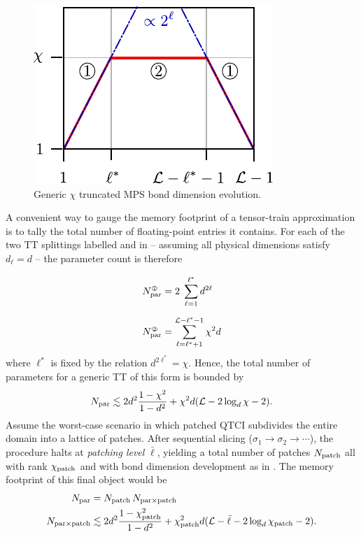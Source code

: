\begin{figure}[ht!]
	\centering
	\includegraphics{figures/TypicalBondDims.pdf}
	\caption{Generic $\chi$ truncated MPS bond dimension evolution.}
	\label{fig:typicalBondDim}
\end{figure}

A convenient way to gauge the memory footprint of a tensor-train approximation is to tally the total number of floating-point entries it contains. For each of the two TT splittings labelled  and  in  -- assuming all physical dimensions satisfy $d_\ell = d$ -- the parameter count is therefore

\begin{equation}
	\begin{aligned}
		N^{\raisebox{.5pt}{\tiny \textcircled{\raisebox{-0.6pt} {1}}}}_{\text{par}} &= 2\;\sum\limits_{\ell = 1}^{\ell^*} d^{2\ell}  \\[6pt]
		N^{\raisebox{.5pt}{\tiny \textcircled{\raisebox{-0.6pt} {2}}}}_{\text{par}} &= \sum\limits_{\ell = \ell^* + 1}^{\mL - \ell^* - 1} \chi^2d
	\end{aligned}
\end{equation}
where $\ell^*$ is fixed by the relation $d^{2\ell^*} = \chi$. Hence, the total number of parameters for a generic TT of this form is bounded by
\begin{equation} 
	N_{\text{par}} \lesssim 2 d^2 \frac{1 - \chi^2 }{1 - d^2} + \chi^2d (\mathcal{L} - 2 \log_d \chi - 2). 
\end{equation}
Assume the worst-case scenario in which patched QTCI subdivides the entire domain into a lattice of patches. After sequential slicing ($\sigma_1 \to \sigma_2 \to \cdots$), the procedure halts at \textit{patching level} ${\bar \ell}$, yielding a total number of patches $N_{\text{patch}}$ all with rank $\chi_{\text{patch}}$ and with bond dimension development as in . The memory footprint of this final object would be 
\begin{equation}
	\begin{aligned}
		N_{\text{par}} &= N_{\text{patch}}\, N_{\text{par}\times \text{patch}}\\
		N_{\text{par}\times \text{patch}} &\lesssim  2 d^2 \frac{1 - \chi_{\text{patch}}^2 }{1 - d^2} + \chi_{\text{patch}}^2d (\mathcal{L} - {\bar \ell} - 2 \log_d \chi_{\text{patch}} - 2).
	\end{aligned}
	\label{eq:patchMemoryEstimate}
\end{equation}

